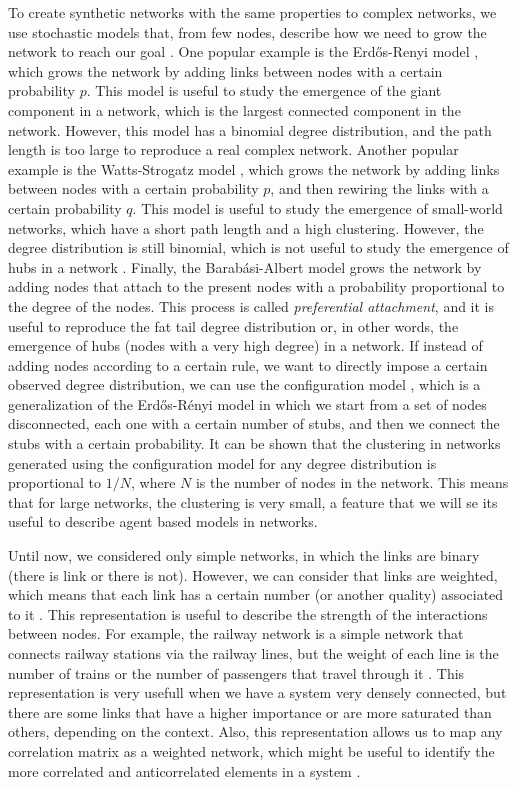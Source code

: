 To create synthetic networks with the same properties to complex networks, we use stochastic models that, from few nodes, describe how we need to grow the network to reach our goal \cite{posfai2016network}. One popular example is the Erd\H{o}s-Renyi model \cite{erdos1960evolution}, which grows the network by adding links between nodes with a certain probability $p$. This model is useful to study the emergence of the giant component in a network, which is the largest connected component in the network. However, this model has a binomial degree distribution, and the path length is too large to reproduce a real complex network. Another popular example is the Watts-Strogatz model \cite{watts1998collective}, which grows the network by adding links between nodes with a certain probability $p$, and then rewiring the links with a certain probability $q$. This model is useful to study the emergence of small-world networks, which have a short path length and a high clustering. However, the degree distribution is still binomial, which is not useful to study the emergence of hubs in a network \cite{newman2003structure}. Finally, the Barab\'asi-Albert model \cite{barabasi1999emergence} grows the network by adding nodes that attach to the present nodes with a probability proportional to the degree of the nodes. This process is called \textit{preferential attachment}, and it is useful to reproduce the fat tail degree distribution or, in other words, the emergence of hubs (nodes with a very high degree) in a network. If instead of adding nodes according to a certain rule, we want to directly impose a certain observed degree distribution, we can use the configuration model \cite{newman-book}, which is a generalization of the Erd\H{o}s-R\'enyi model in which we start from a set of nodes disconnected, each one with a certain number of stubs, and then we connect the stubs with a certain probability. It can be shown that the clustering in networks generated using the configuration model for any degree distribution is proportional to $1/N$, where $N$ is the number of nodes in the network. This means that for large networks, the clustering is very small, a feature that we will se its useful to describe agent based models in networks.

Until now, we considered only simple networks, in which the links are binary (there is link or there is not). However, we can consider that links are weighted, which means that each link has a certain number (or another quality) associated to it \cite{barrat2004architecture}. This representation is useful to describe the strength of the interactions between nodes. For example, the railway network is a simple network that connects railway stations via the railway lines, but the weight of each line is the number of trains or the number of passengers that travel through it \cite{latora-2002}. This representation is very usefull when we have a system very densely connected, but there are some links that have a higher importance or are more saturated than others, depending on the context. Also, this representation allows us to map any correlation matrix as a weighted network, which might be useful to identify the more correlated and anticorrelated elements in a system \cite{onnela-2003,tumminello-2005}.


